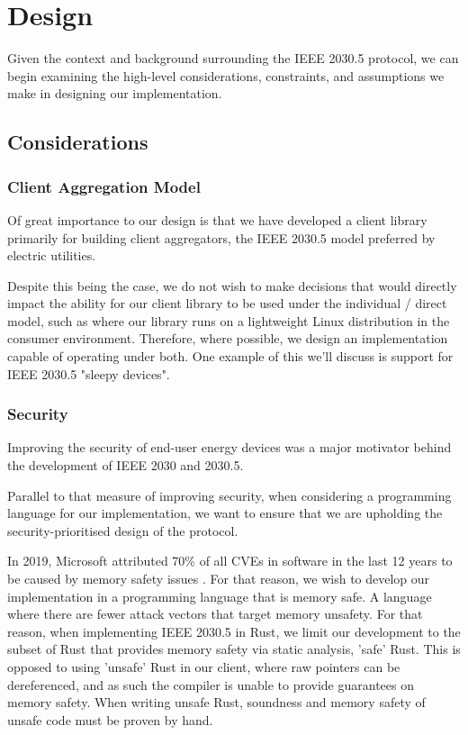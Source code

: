\chapter{Design}\label{ch:design}
Given the context and background surrounding the IEEE 2030.5 protocol, we can begin examining the high-level considerations, constraints, and assumptions we make in designing our implementation.

\section{Considerations}

\subsection{Client Aggregation Model}
Of great importance to our design is that we have developed a client library primarily for building client aggregators, the IEEE 2030.5 model preferred by electric utilities.

Despite this being the case, we do not wish to make decisions that would directly impact the ability for our client library to be used under the individual / direct model, such as where our library runs on a lightweight Linux distribution in the consumer environment. Therefore, where possible, we design an implementation capable of operating under both. One example of this we'll discuss is support for IEEE 2030.5 "sleepy devices".

\subsection{Security}
Improving the security of end-user energy devices was a major motivator behind the development of IEEE 2030 and 2030.5. 

Parallel to that measure of improving security, when considering a programming language for our implementation, we want to ensure that we are upholding the security-prioritised design of the protocol.

In 2019, Microsoft attributed 70\% of all CVEs in software in the last 12 years to be caused by memory safety issues \cite[]{SecurityMemorySafety}. For that reason, we wish to develop our implementation in a programming language that is memory safe. A language where there are fewer attack vectors that target memory unsafety. For that reason, when implementing IEEE 2030.5 in Rust, we limit our development to the subset of Rust that provides memory safety via static analysis, 'safe' Rust. This is opposed to using 'unsafe' Rust in our client, where raw pointers can be dereferenced, and as such the compiler is unable to provide guarantees on memory safety. When writing unsafe Rust, soundness and memory safety of unsafe code must be proven by hand.

